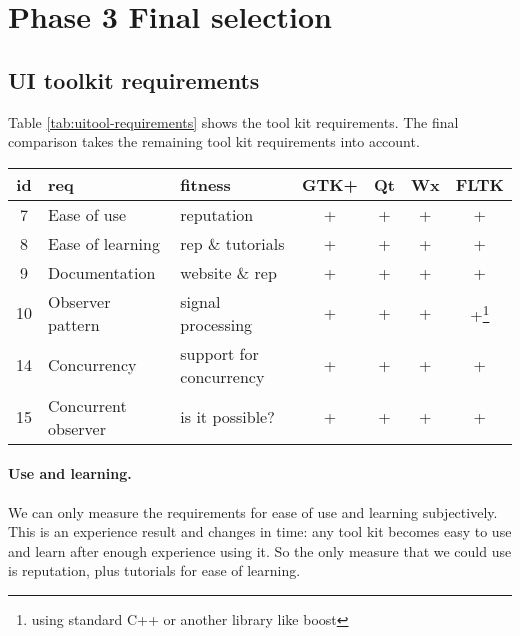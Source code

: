 \section{Phase 3 Final selection}

\subsection{UI toolkit requirements} 

Table \ref{tab:uitool-requirements} shows the tool kit requirements. 
The final comparison takes the remaining tool kit requirements into account.

\vspace{1em}
\begin{minipage}{.95\textwidth}
	\begin{center}
		\small\sf
		\begin{tabular}{|c|p{9em}|p{8em}|cccc|}
			\hline
			{\bf id} & {\bf req}             & {\bf fitness}           & {\bf GTK+} & {\bf Qt} & {\bf Wx} & {\bf FLTK}\\
			\hline
			    7    & Ease of use           & reputation              & +                      & + & + & +\\
			    8    & Ease of learning      & rep \& tutorials        & +                      & + & + & +\\
			    9    & Documentation         & website \& rep          & +                      & + & + & + \\
			    10   & Observer pattern      & signal processing       & +                      & + & + & 
			    +\footnote{using standard C++ or another library like boost\label{fn:c++}} \\
			    14   & Concurrency           & support for concurrency & +                      & + & + & +\footref{fn:c++} \\
			    15   & Concurrent observer   & is it possible?         & +                      & + & + & +\footref{fn:c++} \\
				\hline
		\end{tabular}
		\label{tab:final-comparison}
	\end{center}
\end{minipage}

\paragraph{Use and learning.} We can only measure the requirements for ease of use
and learning subjectively. This is an experience result and changes in time:
any tool kit becomes easy to use and learn after enough experience using it. So the only
measure that we could use is reputation, plus tutorials for ease of learning. 


